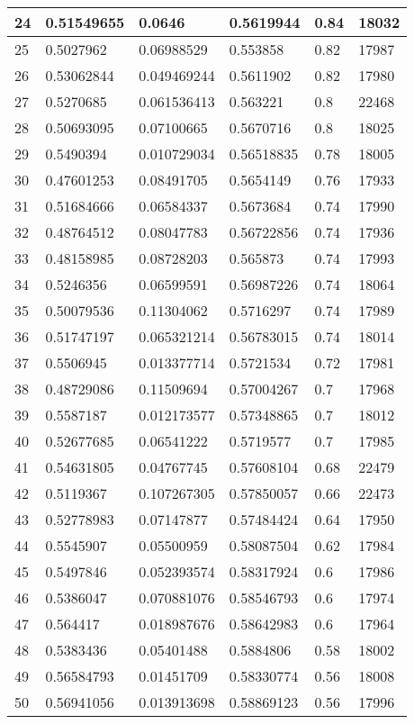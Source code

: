 \begin{longtable}{|l|l|l|l|l|l|}
24 & 0.51549655 & 0.0646 & 0.5619944 & 0.84 & 18032 \\ \hline 
25 & 0.5027962 & 0.06988529 & 0.553858 & 0.82 & 17987 \\ \hline 
26 & 0.53062844 & 0.049469244 & 0.5611902 & 0.82 & 17980 \\ \hline 
27 & 0.5270685 & 0.061536413 & 0.563221 & 0.8 & 22468 \\ \hline 
28 & 0.50693095 & 0.07100665 & 0.5670716 & 0.8 & 18025 \\ \hline 
29 & 0.5490394 & 0.010729034 & 0.56518835 & 0.78 & 18005 \\ \hline 
30 & 0.47601253 & 0.08491705 & 0.5654149 & 0.76 & 17933 \\ \hline 
31 & 0.51684666 & 0.06584337 & 0.5673684 & 0.74 & 17990 \\ \hline 
32 & 0.48764512 & 0.08047783 & 0.56722856 & 0.74 & 17936 \\ \hline 
33 & 0.48158985 & 0.08728203 & 0.565873 & 0.74 & 17993 \\ \hline 
34 & 0.5246356 & 0.06599591 & 0.56987226 & 0.74 & 18064 \\ \hline 
35 & 0.50079536 & 0.11304062 & 0.5716297 & 0.74 & 17989 \\ \hline 
36 & 0.51747197 & 0.065321214 & 0.56783015 & 0.74 & 18014 \\ \hline 
37 & 0.5506945 & 0.013377714 & 0.5721534 & 0.72 & 17981 \\ \hline 
38 & 0.48729086 & 0.11509694 & 0.57004267 & 0.7 & 17968 \\ \hline 
39 & 0.5587187 & 0.012173577 & 0.57348865 & 0.7 & 18012 \\ \hline 
40 & 0.52677685 & 0.06541222 & 0.5719577 & 0.7 & 17985 \\ \hline 
41 & 0.54631805 & 0.04767745 & 0.57608104 & 0.68 & 22479 \\ \hline 
42 & 0.5119367 & 0.107267305 & 0.57850057 & 0.66 & 22473 \\ \hline 
43 & 0.52778983 & 0.07147877 & 0.57484424 & 0.64 & 17950 \\ \hline 
44 & 0.5545907 & 0.05500959 & 0.58087504 & 0.62 & 17984 \\ \hline 
45 & 0.5497846 & 0.052393574 & 0.58317924 & 0.6 & 17986 \\ \hline 
46 & 0.5386047 & 0.070881076 & 0.58546793 & 0.6 & 17974 \\ \hline 
47 & 0.564417 & 0.018987676 & 0.58642983 & 0.6 & 17964 \\ \hline 
48 & 0.5383436 & 0.05401488 & 0.5884806 & 0.58 & 18002 \\ \hline 
49 & 0.56584793 & 0.01451709 & 0.58330774 & 0.56 & 18008 \\ \hline 
50 & 0.56941056 & 0.013913698 & 0.58869123 & 0.56 & 17996 \\ \hline 
\end{longtable}